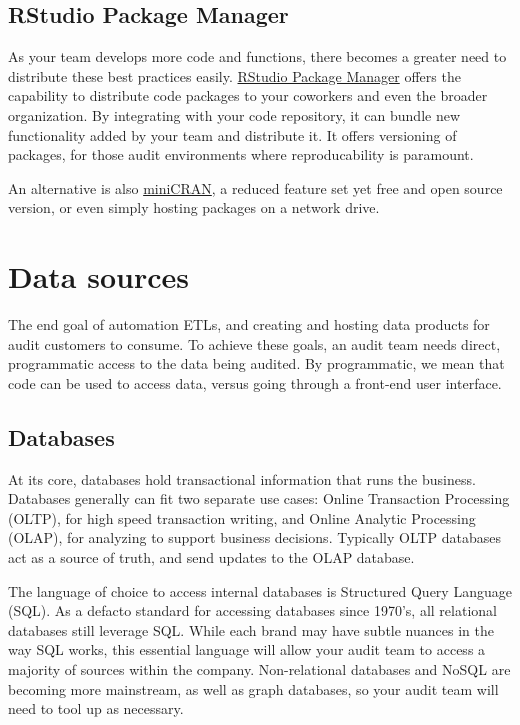 \documentclass[
]{book}
\begin{document}
\hypertarget{rstudio-package-manager}{%
\subsection{RStudio Package Manager}\label{rstudio-package-manager}}

As your team develops more code and functions, there becomes a greater need to distribute these best practices easily. \href{https://rstudio.com/products/package-manager/}{RStudio Package Manager} offers the capability to distribute code packages to your coworkers and even the broader organization. By integrating with your code repository, it can bundle new functionality added by your team and distribute it. It offers versioning of packages, for those audit environments where reproducability is paramount.

An alternative is also \href{https://cran.r-project.org/web/packages/miniCRAN/index.html}{miniCRAN}, a reduced feature set yet free and open source version, or even simply hosting packages on a network drive.

\hypertarget{data-sources}{%
\section{Data sources}\label{data-sources}}

The end goal of automation ETLs, and creating and hosting data products for audit customers to consume. To achieve these goals, an audit team needs direct, programmatic access to the data being audited. By programmatic, we mean that code can be used to access data, versus going through a front-end user interface.

\hypertarget{databases}{%
\subsection{Databases}\label{databases}}

At its core, databases hold transactional information that runs the business. Databases generally can fit two separate use cases: Online Transaction Processing (OLTP), for high speed transaction writing, and Online Analytic Processing (OLAP), for analyzing to support business decisions. Typically OLTP databases act as a source of truth, and send updates to the OLAP database.

The language of choice to access internal databases is Structured Query Language (SQL). As a defacto standard for accessing databases since 1970's, all relational databases still leverage SQL. While each brand may have subtle nuances in the way SQL works, this essential language will allow your audit team to access a majority of sources within the company. Non-relational databases and NoSQL are becoming more mainstream, as well as graph databases, so your audit team will need to tool up as necessary.
\end{document}
